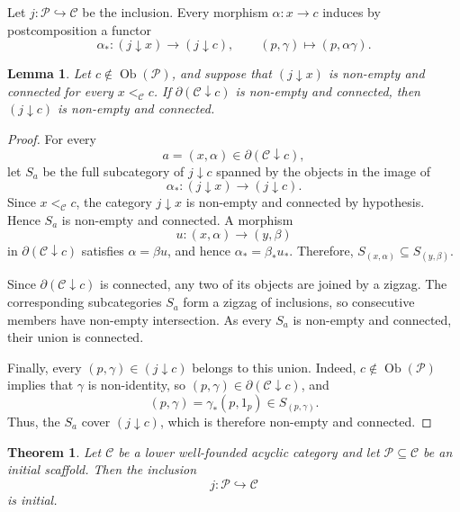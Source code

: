 \documentclass[12pt]{amsart}
\newtheorem{theorem}[teo]{Theorem}
\newtheorem{lemma}[teo]{Lemma}
\theoremstyle{definition}
\theoremstyle{remark}
\numberwithin{figure}{section}%
\newcommand{\CC}{\mathcal{C}}
\begin{document}
Let \(j\colon\mathcal P\hookrightarrow\CC\) be the inclusion. Every
morphism \(\alpha\colon x\to c\) induces by postcomposition a functor
\[
\alpha_*
\colon
(j\downarrow x)\longrightarrow(j\downarrow c),
\qquad
(p,\gamma)\longmapsto(p,\alpha\gamma).
\]

\begin{lemma}\label{lem:connected-lower-comma}
Let \(c\notin\operatorname{Ob}(\mathcal P)\), and suppose that
\((j\downarrow x)\) is non-empty and connected for every \(x<_\CC c\).
If \(\partial(\CC\downarrow c)\) is non-empty and connected, then
\((j\downarrow c)\) is non-empty and connected.
\end{lemma}

\begin{proof}
For every
\[
a=(x,\alpha)\in\partial(\CC\downarrow c),
\]
let \(S_a\) be the full subcategory of \(j\downarrow c\) spanned by the
objects in the image of
\[
\alpha_*
\colon
(j\downarrow x)\longrightarrow(j\downarrow c).
\]
Since \(x<_\CC c\), the category \(j\downarrow x\) is non-empty and
connected by hypothesis. Hence \(S_a\) is non-empty and connected.
A morphism
\[
u\colon(x,\alpha)\longrightarrow(y,\beta)
\]
in \(\partial(\CC\downarrow c)\) satisfies
\(\alpha=\beta u\), and hence
\(
\alpha_*=\beta_*u_*.
\)
Therefore,
\(
S_{(x,\alpha)}
\subseteq
S_{(y,\beta)}.
\)


Since \(\partial(\CC\downarrow c)\) is connected, any two of its objects
are joined by a zigzag. The corresponding subcategories \(S_a\) form a
zigzag of inclusions, so consecutive members have non-empty intersection.
As every \(S_a\) is non-empty and connected, their union is connected.

Finally, every \((p,\gamma)\in(j\downarrow c)\) belongs to this union.
Indeed, \(c\notin\operatorname{Ob}(\mathcal P)\) implies that \(\gamma\)
is non-identity, so \((p,\gamma)\in \partial(\CC\downarrow c)\), and
\[
(p,\gamma)=\gamma_*(p,1_p)\in S_{(p,\gamma)}.
\]
Thus, the \(S_a\) cover \((j\downarrow c)\), which is therefore
non-empty and connected.
\end{proof}

\begin{theorem}\label{thm:initial-scaffold-is-initial}
Let \(\CC\) be a lower well-founded acyclic category and let
\(\mathcal P\subseteq\CC\) be an initial scaffold. Then the inclusion
\[
j\colon\mathcal P\hookrightarrow\CC
\]
is initial.
\end{theorem}
\end{document}
